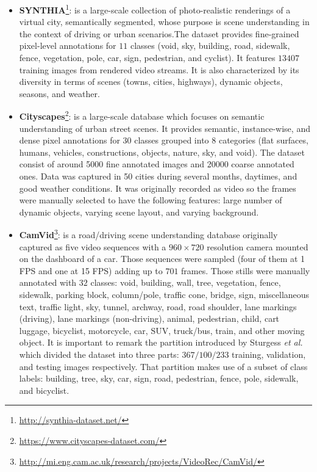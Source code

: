 \begin{itemize}
	\item \textbf{\ac{SYNTHIA}}\cite{Ros2016}\footnote{\url{http://synthia-dataset.net/}}: is a large-scale collection of photo-realistic renderings of a virtual city, semantically segmented, whose purpose is scene understanding in the context of driving or urban scenarios.The dataset provides fine-grained pixel-level annotations for $11$ classes (void, sky, building, road, sidewalk, fence, vegetation, pole, car, sign, pedestrian, and cyclist). It features $13407$ training images from rendered video streams. It is also characterized by its diversity in terms of scenes (towns, cities, highways), dynamic objects, seasons, and weather.
	\item \textbf{Cityscapes}\cite{Cordts2015}\footnote{\url{https://www.cityscapes-dataset.com/}}: is a large-scale database which focuses on semantic understanding of urban street scenes. It provides semantic, instance-wise, and dense pixel annotations for 30 classes grouped into 8 categories (flat surfaces, humans, vehicles, constructions, objects, nature, sky, and void). The dataset consist of around 5000 fine annotated images and 20000 coarse annotated ones. Data was captured in 50 cities during several months, daytimes, and good weather conditions. It was originally recorded as video so the frames were manually selected to have the following features: large number of dynamic objects, varying scene layout, and varying background.
	\item \textbf{CamVid}\cite{Brostow2008}\cite{Brostow2009}\footnote{\url{http://mi.eng.cam.ac.uk/research/projects/VideoRec/CamVid/}}: is a road/driving scene understanding database originally captured as five video sequences with a $960\times720$ resolution camera mounted on the dashboard of a car. Those sequences were sampled (four of them at 1 FPS and one at 15 FPS) adding up to $701$ frames. Those stills were manually annotated with $32$ classes: void, building, wall, tree, vegetation, fence, sidewalk, parking block, column/pole, traffic cone, bridge, sign, miscellaneous text, traffic light, sky, tunnel, archway, road, road shoulder, lane markings (driving), lane markings (non-driving), animal, pedestrian, child, cart luggage, bicyclist, motorcycle, car, SUV, truck/bus, train, and other moving object. It is important to remark the partition introduced by Sturgess \emph{et al.}\cite{Sturgess2009} which divided the dataset into three parts: $367/100/233$ training, validation, and testing images respectively. That partition makes use of a subset of class labels: building, tree, sky, car, sign, road, pedestrian, fence, pole, sidewalk, and bicyclist.

\end{itemize}
